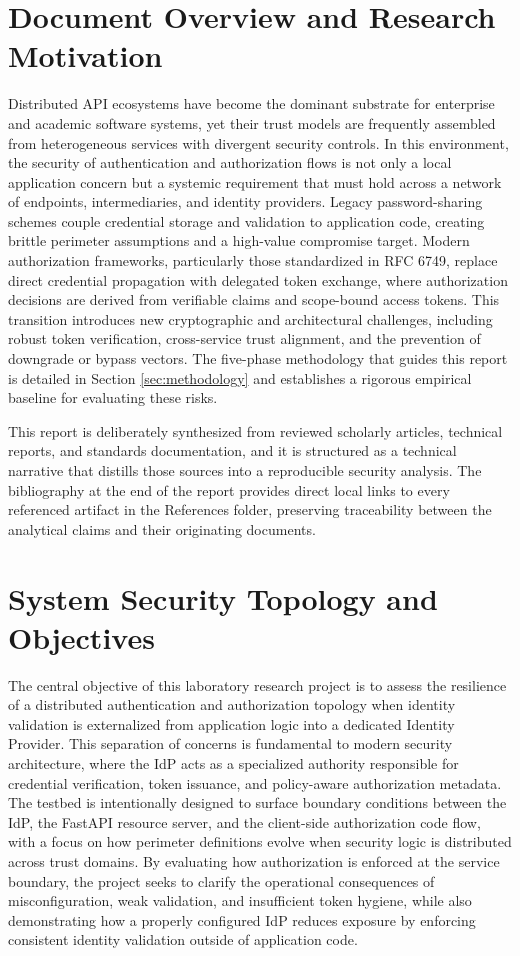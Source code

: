 \documentclass[11pt,a4paper]{report}
\begin{document}
\section{Document Overview and Research Motivation}
\label{sec:overview}
Distributed API ecosystems have become the dominant substrate for enterprise and academic software systems, yet their trust models are frequently assembled from heterogeneous services with divergent security controls. In this environment, the security of authentication and authorization flows is not only a local application concern but a systemic requirement that must hold across a network of endpoints, intermediaries, and identity providers. Legacy password-sharing schemes couple credential storage and validation to application code, creating brittle perimeter assumptions and a high-value compromise target. Modern authorization frameworks, particularly those standardized in RFC 6749, replace direct credential propagation with delegated token exchange, where authorization decisions are derived from verifiable claims and scope-bound access tokens. This transition introduces new cryptographic and architectural challenges, including robust token verification, cross-service trust alignment, and the prevention of downgrade or bypass vectors. The five-phase methodology that guides this report is detailed in Section \ref{sec:methodology} and establishes a rigorous empirical baseline for evaluating these risks.

This report is deliberately synthesized from reviewed scholarly articles, technical reports, and standards documentation, and it is structured as a technical narrative that distills those sources into a reproducible security analysis. The bibliography at the end of the report provides direct local links to every referenced artifact in the References folder, preserving traceability between the analytical claims and their originating documents.

\section{System Security Topology and Objectives}
\label{sec:topology}
The central objective of this laboratory research project is to assess the resilience of a distributed authentication and authorization topology when identity validation is externalized from application logic into a dedicated Identity Provider. This separation of concerns is fundamental to modern security architecture, where the IdP acts as a specialized authority responsible for credential verification, token issuance, and policy-aware authorization metadata. The testbed is intentionally designed to surface boundary conditions between the IdP, the FastAPI resource server, and the client-side authorization code flow, with a focus on how perimeter definitions evolve when security logic is distributed across trust domains. By evaluating how authorization is enforced at the service boundary, the project seeks to clarify the operational consequences of misconfiguration, weak validation, and insufficient token hygiene, while also demonstrating how a properly configured IdP reduces exposure by enforcing consistent identity validation outside of application code.
\end{document}
